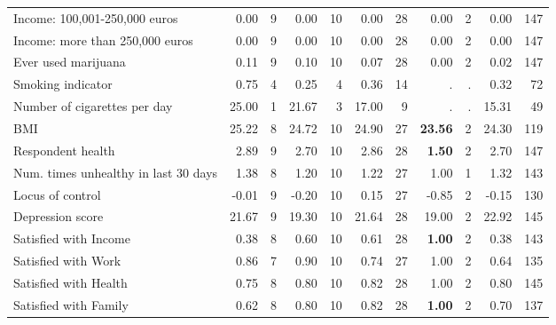 \begin{tabular}{l r r r r r r r r r r}
Income: 100,001-250,000 euros &      0.00 &         9 &      0.00 &        10 &      0.00 &        28 &      0.00 &         2 &      0.00 &       147 \\
Income: more than 250,000 euros &      0.00 &         9 &      0.00 &        10 &      0.00 &        28 &      0.00 &         2 &      0.00 &       147 \\
Ever used marijuana &      0.11 &         9 &      0.10 &        10 &      0.07 &        28 &      0.00 &         2 &      0.02 &       147 \\
Smoking indicator &      0.75 &         4 &      0.25 &         4 &      0.36 &        14 &         . & . &      0.32 &        72 \\
Number of cigarettes per day &     25.00 &         1 &     21.67 &         3 &     17.00 &         9 &         . & . &     15.31 &        49 \\
BMI &     25.22 &         8 &     24.72 &        10 &     24.90 &        27 & \textbf{    23.56} &         2 &     24.30 &       119 \\
Respondent health &      2.89 &         9 &      2.70 &        10 &      2.86 &        28 & \textbf{     1.50} &         2 &      2.70 &       147 \\
Num. times unhealthy in last 30 days &      1.38 &         8 &      1.20 &        10 &      1.22 &        27 &      1.00 &         1 &      1.32 &       143 \\
Locus of control &     -0.01 &         9 &     -0.20 &        10 &      0.15 &        27 &     -0.85 &         2 &     -0.15 &       130 \\
Depression score &     21.67 &         9 &     19.30 &        10 &     21.64 &        28 &     19.00 &         2 &     22.92 &       145 \\
Satisfied with Income &      0.38 &         8 &      0.60 &        10 &      0.61 &        28 & \textbf{     1.00} &         2 &      0.38 &       143 \\
Satisfied with Work &      0.86 &         7 &      0.90 &        10 &      0.74 &        27 &      1.00 &         2 &      0.64 &       135 \\
Satisfied with Health &      0.75 &         8 &      0.80 &        10 &      0.82 &        28 &      1.00 &         2 &      0.80 &       145 \\
Satisfied with Family &      0.62 &         8 &      0.80 &        10 &      0.82 &        28 & \textbf{     1.00} &         2 &      0.70 &       137 \\
\bottomrule
\end{tabular}
